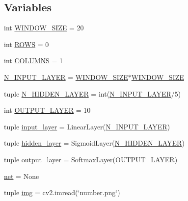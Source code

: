 \subsection*{Variables}
\begin{DoxyCompactItemize}
\item 
int \hyperlink{namespaceimage__processing_a4ef4515e8101fe5f0ef30c37d5f5b2e0}{W\-I\-N\-D\-O\-W\-\_\-\-S\-I\-Z\-E} = 20
\item 
int \hyperlink{namespaceimage__processing_ad193c6467fba4506cadbbe05d616fdb5}{R\-O\-W\-S} = 0
\item 
int \hyperlink{namespaceimage__processing_a1991b46c33bd0e75519fa6f394097ea5}{C\-O\-L\-U\-M\-N\-S} = 1
\item 
\hyperlink{namespaceimage__processing_a7573378d6f95349bc79dff9f973e57b0}{N\-\_\-\-I\-N\-P\-U\-T\-\_\-\-L\-A\-Y\-E\-R} = \hyperlink{namespaceimage__processing_a4ef4515e8101fe5f0ef30c37d5f5b2e0}{W\-I\-N\-D\-O\-W\-\_\-\-S\-I\-Z\-E}$\ast$\hyperlink{namespaceimage__processing_a4ef4515e8101fe5f0ef30c37d5f5b2e0}{W\-I\-N\-D\-O\-W\-\_\-\-S\-I\-Z\-E}
\item 
tuple \hyperlink{namespaceimage__processing_a39da60bdb74b1baaab3a1aa51d225d78}{N\-\_\-\-H\-I\-D\-D\-E\-N\-\_\-\-L\-A\-Y\-E\-R} = int(\hyperlink{namespaceimage__processing_a7573378d6f95349bc79dff9f973e57b0}{N\-\_\-\-I\-N\-P\-U\-T\-\_\-\-L\-A\-Y\-E\-R}/5)
\item 
int \hyperlink{namespaceimage__processing_ad235eb949c209ec5de9c338d1f52b561}{O\-U\-T\-P\-U\-T\-\_\-\-L\-A\-Y\-E\-R} = 10
\item 
tuple \hyperlink{namespaceimage__processing_a7ca15ee314d3685ae47fe44112267e34}{input\-\_\-layer} = Linear\-Layer(\hyperlink{namespaceimage__processing_a7573378d6f95349bc79dff9f973e57b0}{N\-\_\-\-I\-N\-P\-U\-T\-\_\-\-L\-A\-Y\-E\-R})
\item 
tuple \hyperlink{namespaceimage__processing_a35b63551a480b64e520d2206511e29b2}{hidden\-\_\-layer} = Sigmoid\-Layer(\hyperlink{namespaceimage__processing_a39da60bdb74b1baaab3a1aa51d225d78}{N\-\_\-\-H\-I\-D\-D\-E\-N\-\_\-\-L\-A\-Y\-E\-R})
\item 
tuple \hyperlink{namespaceimage__processing_a551071d991a221c6b91ff3be54fef6fc}{output\-\_\-layer} = Softmax\-Layer(\hyperlink{namespaceimage__processing_ad235eb949c209ec5de9c338d1f52b561}{O\-U\-T\-P\-U\-T\-\_\-\-L\-A\-Y\-E\-R})
\item 
\hyperlink{namespaceimage__processing_ae62bdd803c67af980ad811bce63d0c81}{net} = None
\item 
tuple \hyperlink{namespaceimage__processing_a714ff6403e956fcb6206b9422e3811f6}{img} = cv2.\-imread(\char`\"{}number.\-png\char`\"{})

\end{DoxyCompactItemize}
